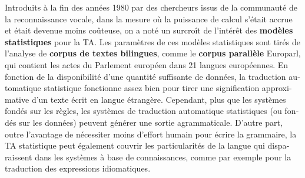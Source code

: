 \begin{french}
\begin{multicols}{2}
Introduits à la fin des années 1980 par des chercheurs issus de la
communauté de la reconnaissance vocale, dans la mesure où la puissance
de calcul s'était accrue et était devenue moins coûteuse, on a noté un
surcroît de l'intérêt des {\bf modèles statistiques} pour la TA. Les
paramètres de ces modèles statistiques sont tirés de l'analyse de
{\bf corpus de textes bilingues}, comme le {\bf corpus parallèle} Europarl, qui
contient les actes du Parlement européen dans 21 langues
européennes. En fonction de la disponibilité d'une quantité suffisante
de données, la traduction automatique statistique fonctionne assez bien pour tirer une
signification approximative d'un texte écrit en langue
étrangère. Cependant, plus que les systèmes fondés sur les règles, les
systèmes de traduction automatique statistiques (ou fondés sur les données) peuvent
générer une sortie agrammaticale. D'autre part, outre l'avantage de
nécessiter moins d'effort humain pour écrire la grammaire, la TA
statistique peut également couvrir les particularités de la langue qui
disparaissent dans les systèmes à base de connaissances, comme par
exemple pour la traduction des expressions idiomatiques.


\end{multicols}
\end{french}
